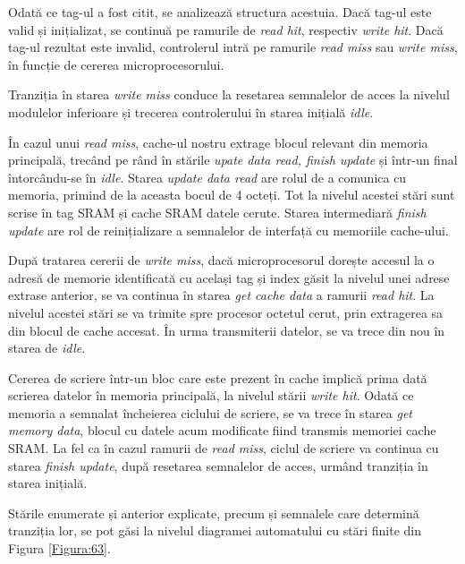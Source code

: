 \documentclass[12pt]{article}
\begin{document}
Odată ce tag-ul a fost citit, se analizează structura acestuia. Dacă tag-ul este valid și inițializat, se continuă pe ramurile de \textit{read hit}, respectiv \textit{write hit}. Dacă tag-ul rezultat este invalid, controlerul intră pe ramurile \textit{read miss} sau \textit{write miss}, în funcție de cererea microprocesorului.

Tranziția în starea \textit{write miss} conduce la resetarea semnalelor de acces la nivelul modulelor inferioare și trecerea controlerului în starea inițială \textit{idle}.

 În cazul unui \textit{read miss}, cache-ul nostru extrage blocul relevant din memoria principală, trecând pe rând în stările \textit{upate data read, finish update} și într-un final întorcându-se în \textit{idle}. Starea \textit{update data read} are rolul de a comunica cu memoria, primind de la aceasta bocul de 4 octeți. Tot la nivelul acestei stări sunt scrise în tag SRAM și cache SRAM datele cerute. Starea intermediară \textit{finish update} are rol de reinițializare a semnalelor de interfață cu memoriile cache-ului.
 
După tratarea cererii de \textit{write miss}, dacă microprocesorul dorește accesul la o adresă de memorie identificată cu același tag și index găsit la nivelul unei adrese extrase anterior, se va continua în starea \textit{get cache data} a ramurii \textit{read hit}. La nivelul acestei stări se va trimite spre procesor octetul cerut, prin extragerea sa din blocul de cache accesat. În urma transmiterii datelor, se va trece din nou în starea de \textit{idle}.
 
Cererea de scriere într-un bloc care este prezent în cache implică prima dată scrierea datelor în memoria principală, la nivelul stării \textit{write hit}. Odată ce memoria a semnalat încheierea ciclului de scriere, se va trece în starea \textit{get memory data}, blocul cu datele acum modificate fiind transmis memoriei cache SRAM. La fel ca în cazul ramurii de \textit{read miss}, ciclul de scriere va continua cu starea \textit{finish update}, după resetarea semnalelor de acces, urmând tranziția în starea inițială.

Stările enumerate și anterior explicate, precum și semnalele care determină tranziția lor, se pot găsi la nivelul diagramei automatului cu stări finite din Figura \ref{Figura:63}.
 
\end{document}
